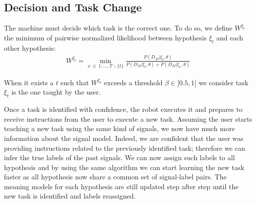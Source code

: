 %
%
%

\subsection{Decision and Task Change}


The machine must decide which task is the correct one. To do so, we define $W^{\xi_t}$ the minimum of pairwise normalized likelihood between hypothesis $\xi_t$ and each other hypothesis: 
%
\begin{eqnarray}
W^{\xi_t} = \min_{x~\in~{1, \ldots, T} \smallsetminus \{t\}} \frac{P(D_M | \xi_t, \theta)}{P(D_M | \xi_t, \theta) + P(D_M | \xi_x, \theta)}
\label{eq:weight}
\end{eqnarray}

When it exists a $t$ such that $W^{\xi_t}$ exceeds a threshold $\beta \in ]0.5,1]$ we consider task $\xi_t$ is the one taught by the user.

Once a task is identified with confidence, the robot executes it and prepares to receive instructions from the user to execute a new task. Assuming the user starts teaching a new task using the same kind of signals, we now have much more information about the signal model. Indeed, we are confident that the user was providing instructions related to the previously identified task; therefore we can infer the true labels of the past signals. We can now  assign such labels to all hypothesis and by using the same algorithm we can start learning the new task faster as all hypothesis now share a common set of signal-label pairs. The meaning models for each hypothesis are still updated step after step until the new task is identified and labels reassigned.

